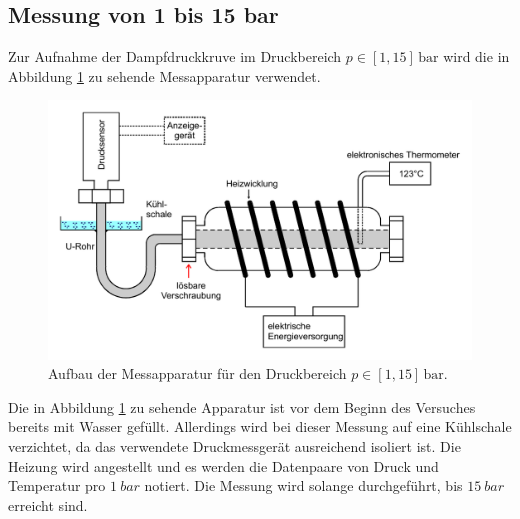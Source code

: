 \subsection{Messung von 1 bis 15 bar}

Zur Aufnahme der Dampfdruckkruve im Druckbereich $p \in [1, 15] \, \mathrm{bar}$ wird die 
in Abbildung \ref{fig:hochdruck} zu sehende Messapparatur verwendet. 
\begin{figure} [H]
    \centering
    \includegraphics[width=12cm] {pictures/hochdruck.pdf} 
    \caption{Aufbau der Messapparatur für den Druckbereich $p \in [1, 15] \, \mathrm{bar}$. \cite[8]{v203}}
    \label{fig:hochdruck}
\end{figure} 

Die in Abbildung \ref{fig:hochdruck} zu sehende Apparatur ist vor dem Beginn des Versuches bereits mit Wasser gefüllt. 
Allerdings wird bei dieser Messung auf eine Kühlschale verzichtet, da das verwendete Druckmessgerät ausreichend isoliert ist.
Die Heizung wird angestellt und es werden die Datenpaare von Druck und Temperatur pro $\qty{1}{bar}$ notiert. 
Die Messung wird solange durchgeführt, bis $\qty{15}{bar}$ erreicht sind.